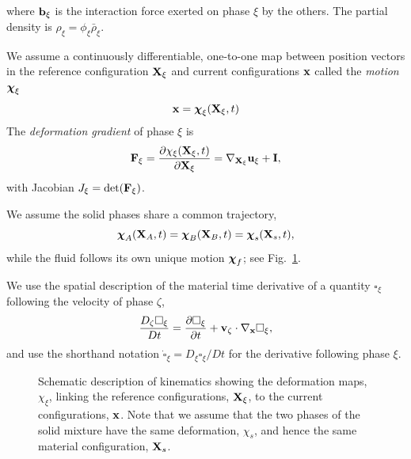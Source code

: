 \documentclass[11pt]{article}
\begin{document}
where $\mathbf{b}_\xi$ is the interaction force exerted on phase $\xi$ by the others.  The partial density is $\rho_\xi = \phi_\xi\bar\rho_\xi$.  

We assume a continuously differentiable, one-to-one map between position vectors in the reference configuration $\mathbf{X}_\xi$ and current configurations $\mathbf{x}$ called the \emph{motion} $\boldsymbol{\chi}_\xi$
%
\[
  \mathbf{x} = \boldsymbol{\chi}_\xi(\mathbf{X}_\xi, t)
\]
%
The \emph{deformation gradient} of phase $\xi$ is
%
\[
  \mathbf{F}_\xi = \frac{\partial \chi_\xi(\mathbf{X}_\xi,t)}{\partial \mathbf{X}_\xi}=\nabla_{\mathbf{X}_\xi}\mathbf{u}_\xi+\mathbf{I},
\]
%
with Jacobian $J_\xi = \det(\mathbf{F}_\xi)$.


We assume the solid phases share a common trajectory,
\[
  \boldsymbol{\chi}_A(\mathbf{X}_A,t)=\boldsymbol{\chi}_B(\mathbf{X}_B,t)=\boldsymbol{\chi}_s(\mathbf{X}_s,t),
\]
while the fluid follows its own unique motion $\boldsymbol{\chi}_f$; see Fig.~\ref{fig:kinematics}.  


We use the spatial description of the material time derivative of a quantity $\square_\xi$ following the velocity of phase $\zeta$,
\[
  \frac{D_\zeta \square_\xi}{Dt} = \frac{\partial \square_\xi}{\partial t}+\mathbf{v}_\zeta\cdot\nabla_{\mathbf{x}}\square_\xi,
\]
and use the shorthand notation $\dot\square_\xi = D_\xi \square_\xi/Dt$ for the derivative following phase $\xi$.
%
\begin{figure}
\centering
{}
\caption{Schematic description of kinematics showing the deformation maps, $\chi_\xi$, linking the reference configurations, $\mathbf{X}_\xi$, to the current configurations, $\mathbf{x}$. Note that we assume that the two phases of the solid mixture have the same deformation, $\chi_s$, and hence the same material configuration, $\mathbf{X}_s$.}
\label{fig:kinematics}
\end{figure}
%
\end{document}
